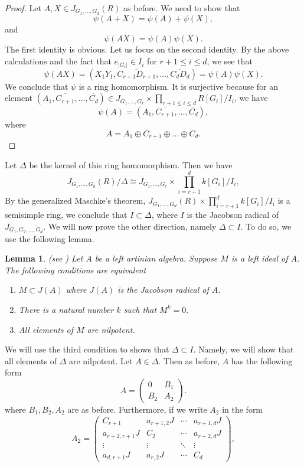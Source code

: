 \documentclass[12pt, a4paper]{amsart}
\numberwithin{equation}{section} %
\theoremstyle{plain}
\theoremstyle{definition}
\theoremstyle{plain}
\newtheorem{lem}[thm]{Lemma}
\theoremstyle{remark}
\newcommand{\ones}{J}
\begin{document}
\begin{proof}
Let $A,X \in J_{G_1, \ldots, G_d}(R)$ as before. We need to show that
\[ \psi(A+X)=\psi(A)+\psi(X), \]
and 
\[ \psi(AX)=\psi(A) \psi(X).\] 
The first identity is obvious. Let us focus on the second identity. By the above calculations and the fact that $e_{|G_i|} \in I_i$ for $r+1 \leq i \leq d$, we see that 
\[ \psi(AX)=(X_1Y_1, \overline{C_{r+1} D_{r+1}}, \ldots, \overline{C_{d} D_d}) =\psi(A) \psi(X) .\] 
We conclude that $\psi$ is a ring homomorphism. It is surjective because for an element $(A_1, \overline{C_{r+1}}, \ldots, \overline{C_{d}}) \in J_{G_1, \ldots, G_r} \times \prod_{r+1 \leq i \leq d} R[G_i]/I_i$, we have  
\[ \psi(A)= (A_1, \overline{C_{r+1}}, \ldots, \overline{C_{d}}), \]
where 
\[ A= A_1 \oplus C_{r+1} \oplus \ldots \oplus C_d .\] 
\end{proof}
Let $\Delta$ be the kernel of this ring homomorphism. Then we have 
\[ J_{G_1, \ldots, G_d}(R)/ \Delta \cong J_{G_1, \ldots, G_r} \times \prod_{i=r+1}^d k[G_i]/I_i ,\] 
By the generalized Maschke's theorem, $J_{G_1, \ldots, G_d}(R) \times \prod_{i=r+1}^d k[G_i]/I_i$ is a semisimple ring, we conclude that  $I \subset \Delta$, where $I$ is the Jacobson radical of $J_{G_1, G_2, \ldots, G_d}.$ We will now prove the other direction, namely $\Delta \subset I.$ To do so, we use the following lemma. 
\begin{lem} (see \cite[Section 4.4]{pierce1982associative})
Let $A$ be a left artinian algebra. Suppose $M$ is a left ideal of $A$. The following conditions are equivalent 
\begin{enumerate}
    \item $M \subset J(A)$ where $J(A)$ is the Jacobson radical of $A$. 
    \item There is a natural number $k$ such that $M^k=0.$
    \item All elements of $M$ are nilpotent. 
\end{enumerate}
\end{lem}
We will use the third condition to shows that $\Delta \subset I$. Namely, we will show that all elements of $\Delta$ are nilpotent. Let $A \in \Delta$. Then as before, $A$ has the following form 
\[ A =\begin{pmatrix} 0 & B_1 \\ B_2 & A_2 \end{pmatrix} .\] 
where $B_1, B_2, A_2$ are as before. Furthermore, if we write $A_2$ in the form 
\begin{equation*}
A_2=\left(\begin{array}{c|c|c|c}
C_{r+1} & a_{r+1,2}\ones & \cdots & a_{r+1,d}\ones \\
\hline
a_{r+2,r+1}\ones & C_2 & \cdots & a_{r+2,d}\ones \\
\hline
\vdots & \vdots & \ddots & \vdots \\
\hline
a_{d,r+1}\ones & a_{r,2}\ones & \cdots & C_d
\end{array}\right),
\end{equation*}
\end{document}
